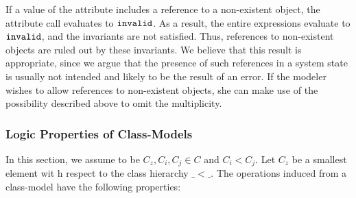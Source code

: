 If a value of the attribute  includes a reference to a non-existent
object, the attribute call evaluates to $\mathtt{invalid}$. As a result, the
entire expressions evaluate to $\mathtt{invalid}$, and the invariants are not
satisfied. Thus, references to non-existent objects are ruled out by these
invariants. We believe that this result is appropriate, since we argue that the
presence of such references in a system state is usually not intended and likely
to be the result of an error. If the modeler wishes to allow references to
non-existent objects, she can make use of the possibility described above to
omit the multiplicity.

\subsubsection{Logic Properties of Class-Models}\label{sec:logicprop-datamodel}
In this section, we assume to be $C_z,C_i,C_j \in C$ and  $C_i < C_j$. 
Let $C_z$ be a smallest element wit h respect to the class hierarchy $\_ < \_$.
The operations induced from a class-model have the following properties:
